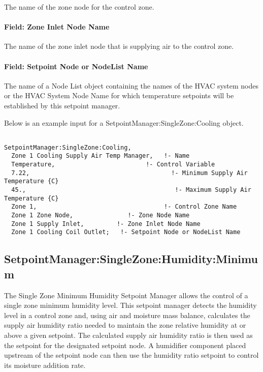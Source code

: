 The name of the zone node for the control zone.

\paragraph{Field: Zone Inlet Node Name}\label{field-zone-inlet-node-name-2}

The name of the zone inlet node that is supplying air to the control zone.

\paragraph{Field: Setpoint Node or NodeList Name}\label{field-setpoint-node-or-nodelist-name-5}

The name of a Node List object containing the names of the HVAC system nodes or the HVAC System Node Name for which temperature setpoints will be established by this setpoint manager.

Below is an example input for a SetpointManager:SingleZone:Cooling object.

\begin{lstlisting}

SetpointManager:SingleZone:Cooling,
  Zone 1 Cooling Supply Air Temp Manager,   !- Name
  Temperature,                         !- Control Variable
  7.22,                                       !- Minimum Supply Air Temperature {C}
  45.,                                         !- Maximum Supply Air Temperature {C}
  Zone 1,                                   !- Control Zone Name
  Zone 1 Zone Node,               !- Zone Node Name
  Zone 1 Supply Inlet,         !- Zone Inlet Node Name
  Zone 1 Cooling Coil Outlet;   !- Setpoint Node or NodeList Name
\end{lstlisting}

\subsection{SetpointManager:SingleZone:Humidity:Minimum}\label{setpointmanagersinglezonehumidityminimum}

The Single Zone Minimum Humidity Setpoint Manager allows the control of a single zone minimum humidity level. This setpoint manager detects the humidity level in a control zone and, using air and moisture mass balance, calculates the supply air humidity ratio needed to maintain the zone relative humidity at or above a given setpoint. The calculated supply air humidity ratio is then used as the setpoint for the designated setpoint node. A humidifier component placed upstream of the setpoint node can then use the humidity ratio setpoint to control its moisture addition rate.

